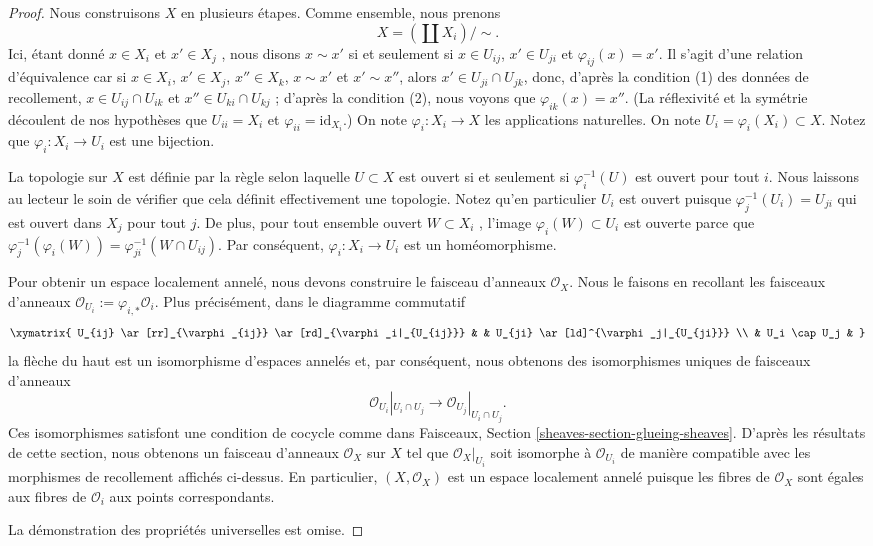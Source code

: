\begin{proof}
Nous construisons  $X$  en plusieurs étapes. Comme ensemble, nous prenons
$$
X = (\coprod X_i) / \sim.
$$
Ici, étant donné  $x \in X_i$  et  $x' \in X_j$ , nous disons  $x \sim x'$  si et
seulement si  $x \in U_{ij}$,  $x' \in U_{ji}$  et  $\varphi_{ij}(x) = x'$. Il s'agit d'une relation
d'équivalence car si  $x \in X_i$,  $x' \in X_j$,  $x'' \in X_k$,  $x \sim x'$  et
 $x' \sim x''$, alors  $x' \in U_{ji} \cap U_{jk}$, donc, d'après la condition (1) des
données de recollement,  $x \in U_{ij} \cap U_{ik}$  et  $x'' \in U_{ki} \cap U_{kj}$ ; d'après la condition (2), nous voyons
que  $\varphi_{ik}(x) = x''$. (La réflexivité et la symétrie découlent de nos hypothèses que
 $U_{ii} = X_i$  et  $\varphi_{ii} = \text{id}_{X_i}$.) On note  $\varphi_i : X_i \to X$  les applications naturelles.
On note  $U_i = \varphi_i(X_i) \subset X$. Notez que  $\varphi_i : X_i \to U_i$  est une bijection.

\medskip\noindent
La topologie sur  $X$  est définie par la règle selon laquelle  $U \subset X$ 
est ouvert si et seulement si  $\varphi_i^{-1}(U)$  est ouvert pour tout  $i$. Nous
laissons au lecteur le soin de vérifier que cela définit effectivement une
topologie. Notez qu'en particulier  $U_i$  est ouvert puisque  $\varphi_j^{-1}(U_i)
= U_{ji}$ 
qui est ouvert dans  $X_j$  pour tout  $j$. De plus, pour tout
ensemble ouvert  $W \subset X_i$ , l'image  $\varphi_i(W) \subset U_i$  est ouverte parce que
 $\varphi_j^{-1}(\varphi_i(W)) = \varphi_{ji}^{-1}(W \cap U_{ij})$. Par conséquent,  $\varphi_i : X_i \to U_i$  est un homéomorphisme.

\medskip\noindent
Pour obtenir un espace localement annelé, nous devons construire le faisceau
d'anneaux  $\mathcal{O}_X$. Nous le faisons en recollant les faisceaux d'anneaux
 $\mathcal{O}_{U_i} := \varphi_{i, *} \mathcal{O}_i$. Plus précisément, dans le diagramme commutatif
$$
\xymatrix{
U_{ij} \ar[rr]_{\varphi_{ij}} \ar[rd]_{\varphi_i|_{U_{ij}}}
& &
U_{ji} \ar[ld]^{\varphi_j|_{U_{ji}}} \\
& U_i \cap U_j &
}
$$
la flèche du haut est un isomorphisme d'espaces annelés et, par conséquent, nous
obtenons des isomorphismes uniques de faisceaux d'anneaux
$$
\mathcal{O}_{U_i}|_{U_i \cap U_j}
\longrightarrow
\mathcal{O}_{U_j}|_{U_i \cap U_j}.
$$
Ces isomorphismes satisfont une condition de cocycle comme dans Faisceaux, Section
 \ref{sheaves-section-glueing-sheaves}. D'après les résultats de cette section, nous obtenons un faisceau
d'anneaux  $\mathcal{O}_X$  sur  $X$  tel que  $\mathcal{O}_X|_{U_i}$  soit isomorphe à
 $\mathcal{O}_{U_i}$  de manière compatible avec les morphismes de recollement affichés
ci-dessus. En particulier,  $(X, \mathcal{O}_X)$  est un espace localement annelé puisque
les fibres de  $\mathcal{O}_X$  sont égales aux fibres de  $\mathcal{O}_i$  aux points
correspondants.

\medskip\noindent
La démonstration des propriétés universelles est omise.
\end{proof}

